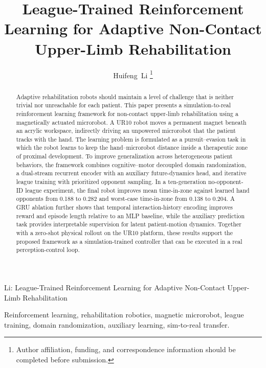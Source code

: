 \documentclass[lettersize,journal]{IEEEtran}
\begin{document}
\title{League-Trained Reinforcement Learning for Adaptive Non-Contact Upper-Limb Rehabilitation}

\author{Huifeng~Li
\thanks{Author affiliation, funding, and correspondence information should be completed before submission.}}

%
{Li: League-Trained Reinforcement Learning for Adaptive Non-Contact Upper-Limb Rehabilitation}

\maketitle

\begin{abstract}
Adaptive rehabilitation robots should maintain a level of challenge that is neither trivial nor unreachable for each patient. This paper presents a simulation-to-real reinforcement learning framework for non-contact upper-limb rehabilitation using a magnetically actuated microrobot. A UR10 robot moves a permanent magnet beneath an acrylic workspace, indirectly driving an unpowered microrobot that the patient tracks with the hand. The learning problem is formulated as a pursuit--evasion task in which the robot learns to keep the hand--microrobot distance inside a therapeutic zone of proximal development. To improve generalization across heterogeneous patient behaviors, the framework combines cognitive--motor decoupled domain randomization, a dual-stream recurrent encoder with an auxiliary future-dynamics head, and iterative league training with prioritized opponent sampling. In a ten-generation no-opponent-ID league experiment, the final robot improves mean time-in-zone against learned hand opponents from 0.188 to 0.282 and worst-case time-in-zone from 0.138 to 0.204. A GRU ablation further shows that temporal interaction-history encoding improves reward and episode length relative to an MLP baseline, while the auxiliary prediction task provides interpretable supervision for latent patient-motion dynamics. Together with a zero-shot physical rollout on the UR10 platform, these results support the proposed framework as a simulation-trained controller that can be executed in a real perception-control loop.
\end{abstract}

\begin{IEEEkeywords}
Reinforcement learning, rehabilitation robotics, magnetic microrobot, league training, domain randomization, auxiliary learning, sim-to-real transfer.
\end{IEEEkeywords}
\end{document}
